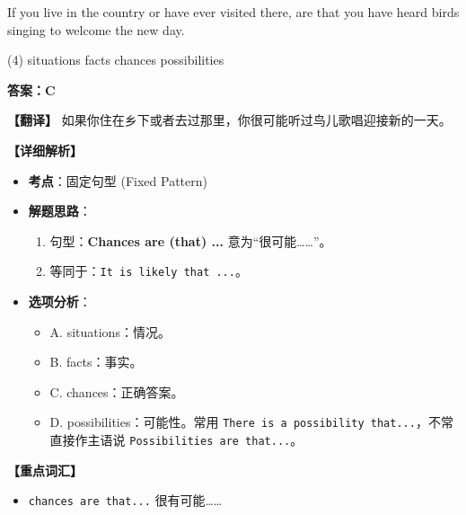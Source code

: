 \documentclass[11pt, a4paper]{article}
\newcommand{\analysis}[4]{
    \begin{solutionbox}
        \textbf{答案：#1}
        
        \textbf{【翻译】} #2
        
        \textbf{【详细解析】}
        #3
        
        \textbf{【重点词汇】}
        #4
    \end{solutionbox}
}
\newcommand{\blank}{\underline{\hspace{1.5cm}}}
\begin{document}
\begin{questions}
    \item If you live in the country or have ever visited there, \blank are that you have heard birds singing to welcome the new day.
    \begin{tasks}(4)
        \task situations \task facts \task chances \task possibilities
    \end{tasks}
    \analysis{C}{如果你住在乡下或者去过那里，你很可能听过鸟儿歌唱迎接新的一天。}{
        \begin{itemize}
            \item \textbf{考点}：固定句型 (Fixed Pattern)
            \item \textbf{解题思路}：
                \begin{enumerate}
                    \item 句型：\textbf{Chances are (that) ...} 意为“很可能……”。
                    \item 等同于：\texttt{It is likely that ...}。
                \end{enumerate}
            \item \textbf{选项分析}：
                \begin{itemize}
                    \item A. situations：情况。
                    \item B. facts：事实。
                    \item C. chances：正确答案。
                    \item D. possibilities：可能性。常用 \texttt{There is a possibility that...}，不常直接作主语说 \texttt{Possibilities are that...}。
                \end{itemize}
        \end{itemize}
    }{
        \begin{itemize}
            \item \texttt{chances are that...} 很有可能……
        \end{itemize}
    }


\end{questions}
\end{document}
